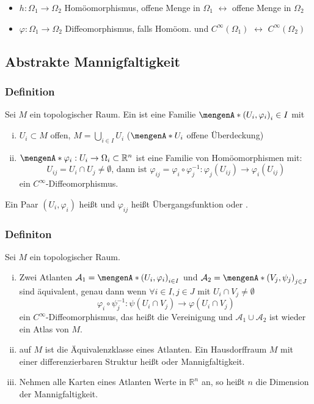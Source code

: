 	\begin{itemize}
		\item $h:\Omega_1 \to \Omega_2$ Homöomorphismus, offene Menge in $\Omega_1$ $\leftrightarrow$ offene Menge in $\Omega_2$
		\item $\varphi:\Omega_1 \to \Omega_2$ Diffeomorphismus, falls Homöom. und $C^{\infty}(\Omega_1)$ $\leftrightarrow$ $C^{\infty}(\Omega_2)$
	\end{itemize}

\subsection{Abstrakte Mannigfaltigkeit}
\label{sub:12}

\subsubsection[Definition: Karte und Atlas]{Definition}
\label{ssub:113}
Sei $M$ ein topologischer Raum. Ein  ist eine Familie $\set{(U_i,\varphi_i)}_i\in I$ mit
\begin{enumerate}[(i)]
	\item $U_i \subset M$ offen, $M = \bigcup_{i \in I} U_i$ ($\set{U_i}$ offene Überdeckung)
	\item $\set{\varphi_i:U_i \to \Omega_i \subset \mathds{R}^n}$ ist eine Familie von Homöomorphismen mit:
	\[
		U_{ij} = U_i \cap U_j \neq \emptyset \text{, dann ist } \varphi_{ij} = \varphi_i \circ \varphi_j^{-1}: \varphi_j(U_{ij}) \to \varphi_i(U_{ij})
	\]
	ein $C^{\infty}$-Diffeomorphismus.
\end{enumerate}
Ein Paar $(U_i,\varphi_i)$ heißt  und $\varphi_{ij}$ heißt Übergangsfunktion oder .

\subsubsection[Definition: Abstrakte differenzierbare Mannigfaltigkeit]{Definiton}
\label{ssub:114}
Sei $M$ ein topologischer Raum.
\begin{enumerate}[(i)]
	\item Zwei Atlanten $\mathcal{A}_1 = \set{(U_i,\varphi_i)}_{i\in I}$ und $\mathcal{A}_2 = \set{(V_j,\psi_j)}_{j\in J}$ sind äquivalent, genau dann wenn $\forall i\in I,j\in J$ mit $U_i\cap V_j\neq \emptyset$
	\[
		\varphi_i\circ \psi_j^{-1}:\psi(U_i\cap V_j) \to \varphi(U_i\cap V_j)
	\]
	ein $C^{\infty}$-Diffeomorphismus, das heißt die Vereinigung und $\mathcal{A}_1 \cup \mathcal{A}_2$ ist wieder ein Atlas von $M$.
	\item {} auf $M$ ist die Äquivalenzklasse eines Atlanten. Ein Hausdorffraum $M$ mit einer differenzierbaren Struktur heißt  oder Mannigfaltigkeit.
	\item Nehmen alle Karten eines Atlanten Werte in $\mathds{R}^n$ an, so heißt $n$ die Dimension der Mannigfaltigkeit.
\end{enumerate}

